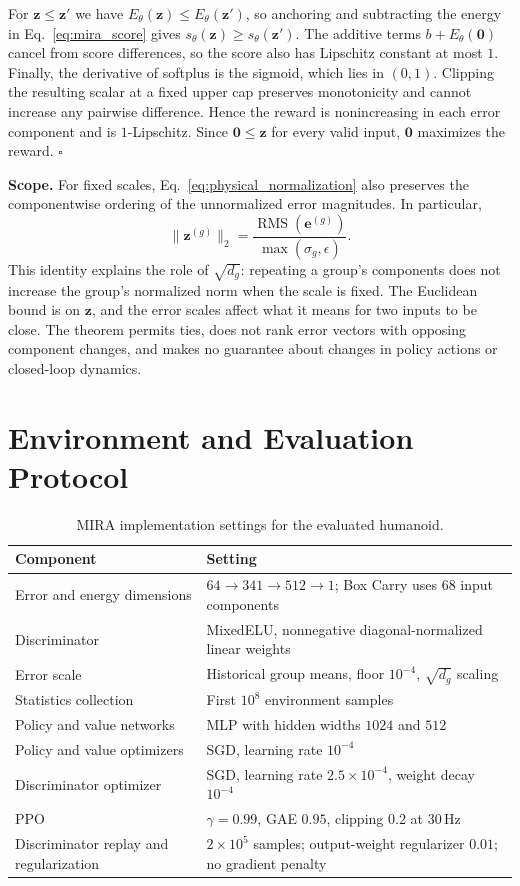 For $\mathbf z\leq\mathbf z'$ we have
$E_\theta(\mathbf z)\leq E_\theta(\mathbf z')$, so anchoring and
subtracting the energy in Eq.~\eqref{eq:mira_score} gives
$s_\theta(\mathbf z)\geq s_\theta(\mathbf z')$. The additive terms
$b+E_\theta(\mathbf 0)$ cancel from score differences, so the score
also has Lipschitz constant at most $1$. Finally, the derivative of
softplus is the sigmoid, which lies in $(0,1)$. Clipping the resulting
scalar at a fixed upper cap preserves monotonicity and cannot increase
any pairwise difference. Hence the reward is nonincreasing in each
error component and is $1$-Lipschitz. Since $\mathbf 0\leq\mathbf z$
for every valid input, $\mathbf 0$ maximizes the reward. \hfill$\square$

\medskip
\noindent\textbf{Scope.}
For fixed scales, Eq.~\eqref{eq:physical_normalization} also preserves
the componentwise ordering of the unnormalized error magnitudes.
In particular,
\[
\|\mathbf z^{(g)}\|_2
= \frac{\operatorname{RMS}(\mathbf e^{(g)})}{\max(\sigma_g,\epsilon)}.
\]
This identity explains the role of $\sqrt{d_g}$: repeating a group's
components does not increase the group's normalized norm when the scale
is fixed. The Euclidean bound is on $\mathbf z$, and the error scales
affect what it means for two inputs to be close. The theorem permits
ties, does not rank error vectors with opposing component changes,
and makes no guarantee about changes in policy actions or closed-loop
dynamics.

\clearpage
\section{Environment and Evaluation Protocol}
\label{app:protocol}

\begin{table}[!ht]
\caption{MIRA implementation settings for the evaluated humanoid.}
\label{tab:config}
\centering\small
\begin{tabular*}{0.91\linewidth}{@{\extracolsep{\fill}}ll@{}}
\toprule
Component & Setting \\
\midrule
Error and energy dimensions & $64\to341\to512\to1$; Box Carry uses $68$ input components \\
Discriminator & MixedELU, nonnegative diagonal-normalized linear weights \\
Error scale & Historical group means, floor $10^{-4}$, $\sqrt{d_g}$ scaling \\
Statistics collection & First $10^8$ environment samples \\
Policy and value networks & MLP with hidden widths $1024$ and $512$ \\
Policy and value optimizers & SGD, learning rate $10^{-4}$ \\
Discriminator optimizer & SGD, learning rate $2.5\times10^{-4}$, weight decay $10^{-4}$ \\
PPO & $\gamma=0.99$, GAE $0.95$, clipping $0.2$ at $30\,\mathrm{Hz}$ \\
Discriminator replay and regularization & $2\times10^5$ samples; output-weight regularizer $0.01$; no gradient penalty \\
\bottomrule
\end{tabular*}
\end{table}

